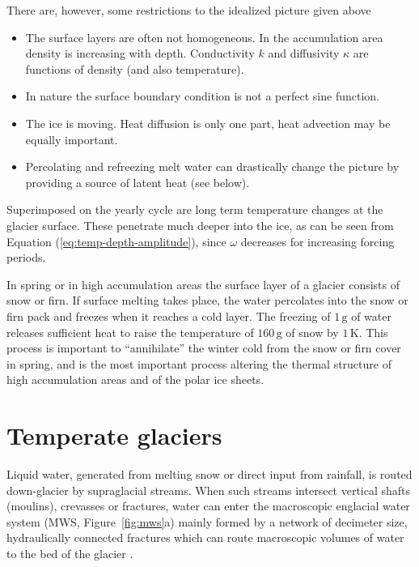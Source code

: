 \documentclass[11pt,a4paper,halfparskip]{scrartcl}
\newcommand{\unit}[1]{\ensuremath{\,\mathrm{#1}}}
\begin{document}
There are, however, some restrictions to the idealized picture given above
%
\begin{itemize}
\item The surface layers are often not homogeneous.  In the accumulation area
 density is increasing with depth. Conductivity $k$ and diffusivity $\kappa$
 are functions of density (and also temperature).
\item In nature the surface boundary condition is not a perfect sine function.
\item The ice is moving.  Heat diffusion is only one part, heat advection may
 be equally important.
\item Percolating and refreezing melt water can drastically change the picture
 by providing a source of latent heat (see below).
\end{itemize}
%
Superimposed on the yearly cycle are long term temperature changes at the
glacier surface.  These penetrate much deeper into the ice, as can be seen
from Equation (\ref{eq:temp-depth-amplitude}), since $\omega$ decreases for
increasing forcing periods.

In spring or in high accumulation areas the surface layer of a glacier
consists of snow or firn.  If surface melting takes place, the water
percolates into the snow or firn pack and freezes when it reaches a cold
layer.  The freezing of $1\unit{g}$ of water releases sufficient heat to raise
the temperature of $160\unit{g}$ of snow by $1\unit{K}$.  This process is
important to ``annihilate'' the winter cold from the snow or firn cover in
spring, and is the most important process altering the thermal structure of
high accumulation areas and of the polar ice sheets.


\section{Temperate glaciers}
\label{sec:temperate-glaciers}

Liquid water, generated from melting snow or direct input from rainfall, is routed down{-}glacier by supraglacial streams. When such streams intersect vertical shafts (moulins), crevasses or fractures, water can enter the macroscopic englacial water system (MWS, Figure~\ref{fig:mws}a) mainly formed by a network of decimeter size, hydraulically connected fractures which can route macroscopic volumes of water to the bed of the glacier \citep{FountainWalder1998,Fountain2005}.
%
\end{document}
